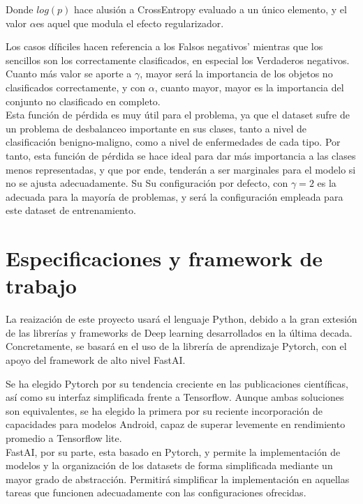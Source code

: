 Donde $log(p)$ hace alusión a CrossEntropy evaluado a un único elemento, y el valor $\alpha$es aquel que modula el efecto regularizador.

Los casos díficiles hacen referencia a los Falsos negativos' mientras que los sencillos son los correctamente clasificados, en especial los Verdaderos negativos. Cuanto más valor se aporte a $\gamma$, mayor será la importancia de los objetos no clasificados correctamente, y con $\alpha$, cuanto mayor, mayor es la importancia del conjunto no clasificado en completo.\\

Esta función de pérdida es muy útil para el problema, ya que el dataset sufre de un problema de desbalanceo importante en sus clases, tanto a nivel de clasificación benigno-maligno, como a nivel de enfermedades de cada tipo. Por tanto, esta función de pérdida se hace ideal para dar más importancia a las clases menos representadas, y que por ende, tenderán a ser marginales para el modelo si no se ajusta adecuadamente. Su Su configuración por defecto, con $\gamma = 2$ es la adecuada para la mayoría de problemas, y será la configuración empleada para este dataset de entrenamiento.

\section{Especificaciones y framework de trabajo}

La reaización de este proyecto usará el lenguaje Python, debido a la gran extesión de las librerías y frameworks de Deep learning desarrollados en la última decada. Concretamente, se basará en el uso de la librería de aprendizaje Pytorch\cite{paszke2019pytorch}, con el apoyo del framework de alto nivel FastAI\cite{howard2018fastai}.

Se ha elegido Pytorch por su tendencia creciente en las publicaciones científicas, así como su interfaz simplificada frente a Tensorflow. Aunque ambas soluciones son equivalentes, se ha elegido la primera por su reciente incorporación de capacidades para modelos Android, capaz de superar levemente en rendimiento promedio a Tensorflow lite.\\

FastAI, por su parte, esta basado en Pytorch, y permite la implementación de modelos y  la organización de los datasets de forma simplificada mediante un mayor grado de abstracción. Permitirá simplificar la implementación en aquellas tareas que funcionen adecuadamente con las configuraciones ofrecidas.\\

